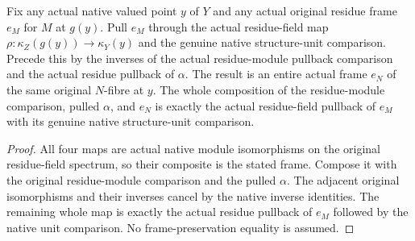 \begin{definition}\label{def:fc-induced-native-residue-frame}
\leanok
{}
Fix any actual native valued point $y$ of $Y$ and any actual original
residue frame $e_M$ for $M$ at $g(y)$. Pull $e_M$ through the actual
residue-field map $\rho:\kappa_Z(g(y))\to\kappa_Y(y)$ and the genuine
native structure-unit comparison. Precede this by the inverses of
the actual residue-module pullback comparison and the actual
residue pullback of $\alpha$. The result is an entire actual frame
$e_N$ of the same original $N$-fibre at $y$. The whole composition
of the residue-module comparison, pulled $\alpha$, and $e_N$ is
exactly the actual residue-field pullback of $e_M$ with its genuine
native structure-unit comparison.
\end{definition}
\begin{proof}
All four maps are actual native module isomorphisms on the original
residue-field spectrum, so their composite is the stated frame.
Compose it with the original residue-module comparison and the
pulled $\alpha$. The adjacent original isomorphisms and their
inverses cancel by the native inverse identities. The remaining
whole map is exactly the actual residue pullback of $e_M$ followed
by the native unit comparison. No frame-preservation equality is
assumed.
\end{proof}


